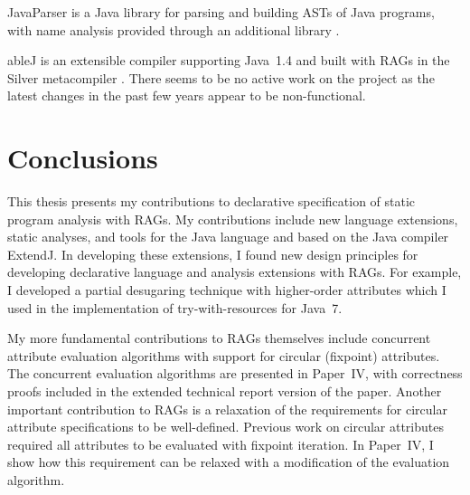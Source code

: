 \documentclass[10pt, twoside, openright]{book}
\begin{document}
JavaParser is a Java library for parsing and building ASTs of Java programs, with name analysis
provided through an additional library \cite{javaparser}.

ableJ is an extensible compiler supporting Java~1.4 and built with RAGs in the Silver metacompiler
\cite{DBLP:conf/ecoop/WykKBS07}.  There seems to be no active
work on the project as the latest changes in the past few years appear to be non-functional.







\section{Conclusions}
\label{sec:conclusions}

This thesis presents my contributions to declarative specification of static program analysis with
RAGs. My contributions include new language extensions, static analyses, and tools for
the Java language and based on the Java compiler ExtendJ.
In developing these extensions, I found new design principles for developing declarative language
and analysis extensions with RAGs. For example, I developed a partial desugaring technique
with higher-order attributes which I used in the implementation of try-with-resources for Java~7.

My more fundamental contributions to RAGs themselves include
concurrent attribute evaluation algorithms with support for circular (fixpoint) attributes.
The concurrent evaluation algorithms are presented in Paper~IV, with correctness proofs
included in the extended technical report version of the paper.
Another important contribution to RAGs is a relaxation of the requirements for circular attribute
specifications to be well-defined. Previous work on circular attributes required all
attributes to be evaluated with fixpoint iteration. In Paper~IV, I show how this requirement
can be relaxed with a modification of the evaluation algorithm.
\end{document}
